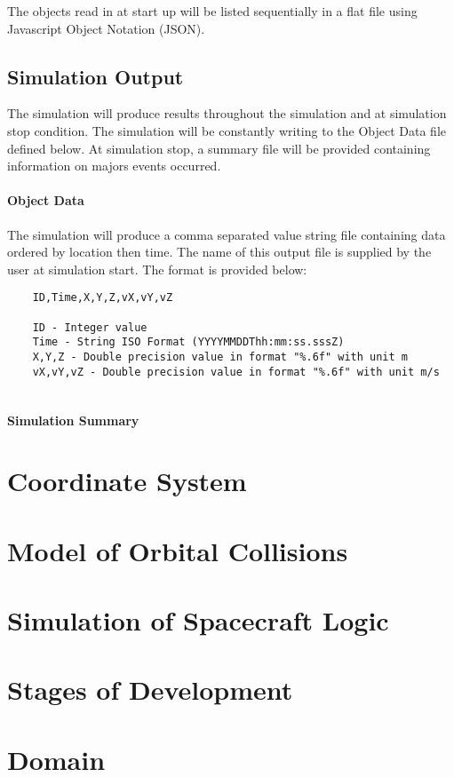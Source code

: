 \documentclass{article}
\begin{document}
  The objects read in at start up will be listed sequentially in a flat file using Javascript Object Notation (JSON).
  
  \subsection{Simulation Output}
  
	The simulation will produce results throughout the simulation and at simulation stop condition. The simulation will be constantly writing to the Object Data file defined below. At simulation stop, a summary file will be provided containing information on majors events occurred. 
  
  \paragraph{Object Data}
  
  The simulation will produce a comma separated value string file containing data ordered by location then time. The name of this output file is supplied by the user at simulation start. The format is provided below:
  
  \begin{verbatim}
  	ID,Time,X,Y,Z,vX,vY,vZ
  	
  	ID - Integer value
  	Time - String ISO Format (YYYYMMDDThh:mm:ss.sssZ)
  	X,Y,Z - Double precision value in format "%.6f" with unit m
  	vX,vY,vZ - Double precision value in format "%.6f" with unit m/s  	
  	
  \end{verbatim}
  
  \paragraph{Simulation Summary}
  
  \section{Coordinate System}
  
  
   
  \section{Model of Orbital Collisions}
  
  \section{Simulation of Spacecraft Logic}
  
  \section{Stages of Development}
  
  \section{Domain}
  
  
\end{document}
